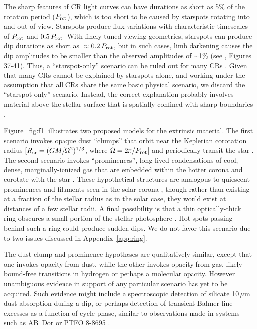 \documentclass[11pt,twocolumn,tighten]{aastex63}
\begin{document}
The sharp features of CR light curves can have durations as short as
5\% of the rotation period ($P_{\rm rot}$), which is too short to be
caused by starspots rotating into and out of view.  Starspots produce
flux variations with characteristic timescales of $P_{\rm rot}$ and
$0.5\,P_{\rm rot}$.  With finely-tuned viewing geometries, starspots
can produce dip durations as short as $\approx$$0.2\,P_{\rm rot}$, but
in such cases, limb darkening causes the dip amplitudes to be smaller
than the observed amplitudes of $\sim$1\% (see
\citealt{2017AJ....153..152S}, Figures 37-41).  Thus, a
``starspot-only'' scenario can be ruled out for many CRs
\citep{2017AJ....153..152S,2019ApJ...876..127Z,2021MNRAS.500.1366K}.
Given that many CRs cannot be explained by starspots alone, and
working under the assumption that all CRs share the same basic
physical scenario, we discard the ``starspot-only'' scenario.
Instead, the correct explanation probably involves material above the
stellar surface that is spatially confined with sharp boundaries
\citep[e.g.][]{2017AJ....153..152S,2022AJ....163..144G}.

Figure~\ref{fig:f1} illustrates two proposed models for the extrinsic
material.  The first scenario invokes opaque dust ``clumps'' that
orbit near the Keplerian corotation radius [$R_{\rm cr} =
(GM/\Omega^2)^{1/3}$, where $\Omega = 2\pi/P_{\rm rot}$] and
periodically transit the star
\citep{2017AJ....153..152S,2023MNRAS.518.4734S}.  The second scenario
invokes ``prominences'', long-lived condensations of cool, dense,
marginally-ionized gas that are embedded within the hotter corona and
corotate with the star
\citep{1989MNRAS.238..657C,2019MNRAS.482.2853J,2022MNRAS.514.5465W}.
These hypothetical structures are analogous to quiescent prominences
and filaments seen in the solar corona \citep[see
e.g.][]{2015ASSL..415.....V}, though rather than existing at a
fraction of the stellar radius as in the solar case, they would exist
at distances of a few stellar radii.  A final possibility is that a
thin optically-thick ring obscures a small portion of the stellar
photosphere \citep{2019ApJ...876..127Z}.  Hot spots passing behind
such a ring could produce sudden dips.  We do not favor this scenario
due to two issues discussed in Appendix~\ref{app:ring}.

The dust clump and prominence hypotheses are qualitatively similar,
except that one invokes opacity from dust, while the other invokes
opacity from gas, likely bound-free transitions in hydrogen or perhaps
a molecular opacity.  However unambiguous evidence in support of any
particular scenario has yet to be acquired.  Such evidence might
include a spectroscopic detection of silicate 10\,$\mu$m dust
absorption during a dip, or perhaps detection of transient Balmer-line
excesses as a function of cycle phase, similar to observations made in
systems such as AB~Dor \citep[see][]{1999ASPC..158..146C} or PTFO
8-8695 \citep{2016ApJ...830...15J}.
\end{document}
